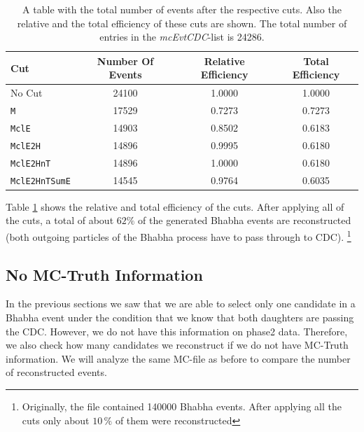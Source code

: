 \documentclass[a4paper,11pt,twosided,final,german,openbib,pdftex,listof=totoc,bibliography=totoc]{scrbook}
\begin{document}
\begin{table}[h!]
	\centering
\begin{tabular}{lccc}
 Cut& Number Of Events&  Relative Efficiency& Total Efficiency\\
 \hline
 No Cut&24100 &1.0000 &1.0000 \\
 \texttt{M}& 17529&0.7273 &0.7273 \\
 \texttt{MclE}&14903 &0.8502 &0.6183 \\
 \texttt{MclE2H}&14896&0.9995  &0.6180 \\
 \texttt{MclE2HnT}&14896 &1.0000 &0.6180 \\
 \texttt{MclE2HnTSumE}& 14545 &0.9764 &0.6035 \\

\end{tabular}

\caption[Cut Efficiencies]{A table with the total number of events after the respective cuts. Also the relative and the total efficiency of these cuts are shown. The total number of entries in the \textit{mcEvtCDC}-list is 24286.}
\label{tab:cutEff}
\end{table}

Table \ref{tab:cutEff} shows the relative and total efficiency of the cuts. After applying all of the cuts, a total of about $62\%$ of the generated Bhabha events are reconstructed (both outgoing particles of the Bhabha process have to pass through to CDC).
\footnote{Originally, the file contained 140000 Bhabha events. After applying all the cuts only about $10\,\%$ of them were reconstructed}

\subsection{No MC-Truth Information}
\label{sec:NoMCT}

In the previous sections we saw that we are able to select only one candidate in a Bhabha event under the condition that we know that both daughters are passing the CDC. However, we do not have this information on phase2 data. Therefore, we also check how many candidates we reconstruct if we do not have MC-Truth information. We will analyze the same MC-file as before to compare the number of reconstructed events. 
\end{document}

